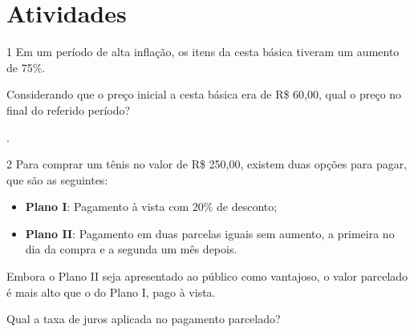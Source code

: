 \section*{Atividades}

\num{1} Em um período de alta inflação, os itens da cesta básica tiveram
um aumento de 75\%.

Considerando que o preço inicial a cesta básica era de R\$ 60,00, qual
o preço no final do referido período?

\begin{emptybox}
.
\vspace{6cm}
\end{emptybox}

\num{2} Para comprar um tênis no valor de R\$ 250,00, existem duas opções
para pagar, que são as seguintes:

\begin{itemize}
  \item \textbf{Plano I}: Pagamento à vista com 20\% de desconto;

  \item \textbf{Plano II}: Pagamento em duas parcelas iguais sem aumento, a primeira no dia da compra e a segunda um mês depois.
\end{itemize}

Embora o Plano II seja apresentado ao público como vantajoso, o valor
parcelado é mais alto que o do Plano I, pago à vista.

Qual a taxa de juros aplicada no pagamento parcelado?

\begin{emptybox}
\vspace{2cm}
\end{emptybox}


